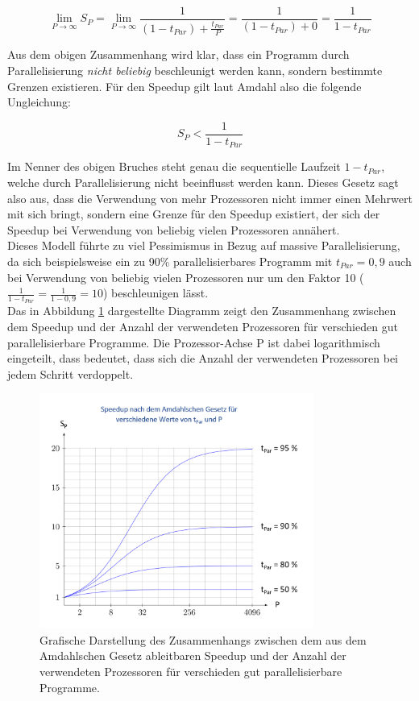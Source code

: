 				\[ \lim\limits_{P \to \infty} S_P = \lim\limits_{P \to \infty} \frac{1}{(1 - t_{Par}) + \frac{t_{Par}}{P}} = \frac{1}{(1 - t_{Par}) + 0} = \frac{1}{1 - t_{Par}} \]
			
				Aus dem obigen Zusammenhang wird klar, dass ein Programm durch Parallelisierung \textit{nicht beliebig} beschleunigt werden kann, sondern bestimmte Grenzen existieren. Für den Speedup gilt laut Amdahl also die folgende Ungleichung:
				
				\[ S_P < \frac{1}{1 - t_{Par}} \]
				
				Im Nenner des obigen Bruches steht genau die sequentielle Laufzeit $1 - t_{Par}$, welche durch Parallelisierung nicht beeinflusst werden kann. Dieses Gesetz sagt also aus, dass die Verwendung von mehr Prozessoren nicht immer einen Mehrwert mit sich bringt, sondern eine Grenze für den Speedup existiert, der sich der Speedup bei Verwendung von beliebig vielen Prozessoren annähert.\\
				Dieses Modell führte zu viel Pessimismus in Bezug auf massive Parallelisierung, da sich beispielsweise ein zu 90\% parallelisierbares Programm mit $t_{Par} = 0,9$ auch bei Verwendung von beliebig vielen Prozessoren nur um den Faktor 10 ($\frac{1}{1 - t_{Par}} = \frac{1}{1 - 0,9} = 10$) beschleunigen lässt.\\
				Das in Abbildung \ref{fig:Amdahlsches_Gesetz} dargestellte Diagramm zeigt den Zusammenhang zwischen dem Speedup und der Anzahl der verwendeten Prozessoren für verschieden gut parallelisierbare Programme. Die Prozessor-Achse P ist dabei logarithmisch eingeteilt, dass bedeutet, dass sich die Anzahl der verwendeten Prozessoren bei jedem Schritt verdoppelt.
				
				\begin{figure}
					\centering	
					\includegraphics[width=9cm]{Abbildungen/Amdahlsches_Gesetz.png}
					\caption{Grafische Darstellung des Zusammenhangs zwischen dem aus dem Amdahlschen Gesetz ableitbaren Speedup und der Anzahl der verwendeten Prozessoren für verschieden gut parallelisierbare Programme. \cite{GesetzeParallelierung}}
					\label{fig:Amdahlsches_Gesetz}
				\end{figure}
				
